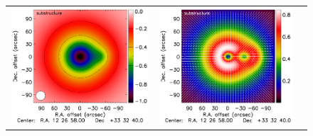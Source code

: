 \documentclass[twocolumn,traditabstract]{aa}
\begin{document}
\begin{figure}[h]
{\begin{tabular}{lll}
\includegraphics[trim=0cm 0.7cm 0cm 0cm, clip=true, scale=1]{Figure/Map_toy_substructure.pdf} &
\includegraphics[trim=2.3cm 0.7cm 0cm 0cm, clip=true, scale=1]{Figure/Grad_substructure_15_15_45.pdf} &

\end{tabular}}
\end{figure}
\end{document}
